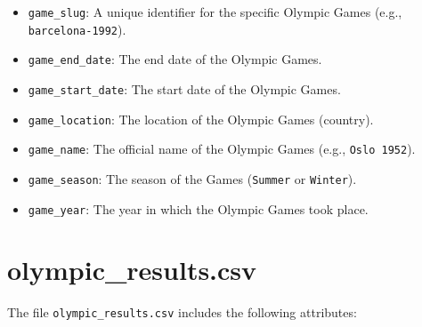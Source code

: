 \begin{itemize}
    \item \texttt{game\_slug}: A unique identifier for the specific Olympic Games (e.g., \texttt{barcelona-1992}).
    \item \texttt{game\_end\_date}: The end date of the Olympic Games.
    \item \texttt{game\_start\_date}: The start date of the Olympic Games.
    \item \texttt{game\_location}: The location of the Olympic Games (country).
    \item \texttt{game\_name}: The official name of the Olympic Games (e.g., \texttt{Oslo 1952}).
    \item \texttt{game\_season}: The season of the Games (\texttt{Summer} or \texttt{Winter}).
    \item \texttt{game\_year}: The year in which the Olympic Games took place.
\end{itemize}

\section{olympic\_results.csv}

The file \texttt{olympic\_results.csv} includes the following attributes:

